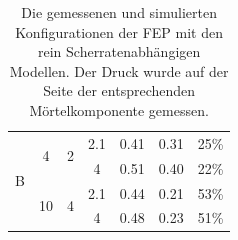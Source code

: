 \begin{table}[htb]
{\begin{tabular}{l c c c r r r}
    \hline
    \hline
    \multirow{4}{*}{\re{} B} &  \multirow{2}{*}{4} & \multirow{2}{*}{2}  & 2.1 & 0.41 & 0.31 &25\%\\
                                                    \cline{4-7}
                              &                     &                    & 4   & 0.51 & 0.40 &22\%\\
                              \cline{2-7}
                              & \multirow{2}{*}{10} & \multirow{2}{*}{4} & 2.1 & 0.44 & 0.21 &53\%\\
                                                    \cline{4-7}
                              &                     &                    & 4   & 0.48 & 0.23 &51\%\\
    \hline\hline
\end{tabular}}
    \caption{Die gemessenen und simulierten Konfigurationen der FEP mit den rein Scherratenabhängigen Modellen. Der Druck wurde auf der Seite der entsprechenden Mörtelkomponente gemessen.}
    \label{fig:fepVergleich}
\end{table}


